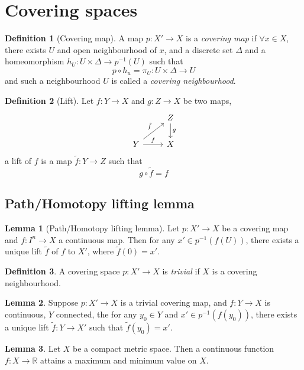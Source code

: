 \documentclass[a4paper,14pt]{extarticle}
\theoremstyle{definition}
\newtheorem*{definition}{Definition}
\newtheorem*{lemma}{Lemma}
\begin{document}
\section{Covering spaces}
\begin{definition}[Covering map]
  A map $p:X'\rightarrow X$ is a \emph{covering map} if $\forall x\in X$, there exists
  $U$ and open neighbourhood of $x$, and a discrete set $\Delta$ and a homeomorphism 
  $h_U:U\times\Delta\rightarrow p^{-1}(U)$ such that \[p\circ h_u=\pi_U:U\times\Delta\rightarrow 
  U\] and such a neighbourhood $U$ is called a \emph{covering neighbourhood}.
\end{definition}

\begin{definition}[Lift]
  Let $f:Y\rightarrow X$ and $g:Z\rightarrow X$ be two maps,
  \[
    \begin{tikzcd}
      &Z\arrow{d}{g} \\ Y\arrow{ur}{\tilde{f}} \arrow{r}{f}&X
    \end{tikzcd}\]
  a lift of $f$ is a map $\tilde{f}:Y\rightarrow Z$ such that \[g\circ\tilde{f}=f\]
\end{definition}

\subsection{Path/Homotopy lifting lemma}
\begin{lemma}[Path/Homotopy lifting lemma]
  Let $p:X'\rightarrow X$ be a covering map and $f:I^n\rightarrow X$ a continuous map.
  Then for any $x'\in p^{-1}(f(U))$, there exists a unique lift $\tilde{f}$ of $f$ to 
  $X'$, where $\tilde{f}(0)=x'$. 
\end{lemma}

\begin{definition}
  A covering space $p:X'\rightarrow X$ is \emph{trivial} if $X$ is a covering neighbourhood.
\end{definition}

\begin{lemma}
  Suppose $p:X'\rightarrow X$ is a trivial covering map, and $f:Y\rightarrow X$ is continuous, 
  $Y$ connected, the for any $y_0\in Y$ and $x'\in p^{-1}(f(y_0))$, there exists a unique 
  lift $\tilde{f}:Y\rightarrow X'$ such that $\tilde{f}(y_0)=x'$.
\end{lemma}

\begin{lemma}
  Let $X$ be a compact metric space. Then a continuous function $f:X\rightarrow\mathbb{R}$  attains a maximum and minimum value on $X$.
\end{lemma}
\end{document}

